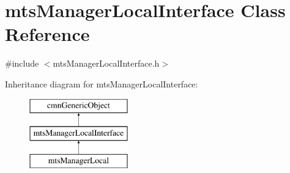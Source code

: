 \hypertarget{classmts_manager_local_interface}{}\section{mts\+Manager\+Local\+Interface Class Reference}
\label{classmts_manager_local_interface}


{\ttfamily \#include $<$mts\+Manager\+Local\+Interface.\+h$>$}

Inheritance diagram for mts\+Manager\+Local\+Interface\+:\begin{figure}[H]
\begin{center}
\leavevmode
\includegraphics[height=3.000000cm]{d2/d2e/classmts_manager_local_interface}
\end{center}
\end{figure}
